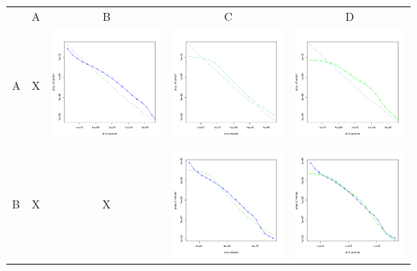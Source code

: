 \documentclass{wscpaperproc}
\begin{document}
\begin{table}[h]
	\centering
	\begin{tabular}{lcccc}
		& A & B & C & D\\
A & X& \includegraphics[width=5cm]{img/A-B.pdf}&\includegraphics[width=5cm]{img/A-C.pdf}&\includegraphics[width=5cm]{img/A-D.pdf}\\
B & X& X &\includegraphics[width=5cm]{img/B-C.pdf}&\includegraphics[width=5cm]{img/B-D.pdf}\\

\end{tabular}
\end{table}
\end{document}
